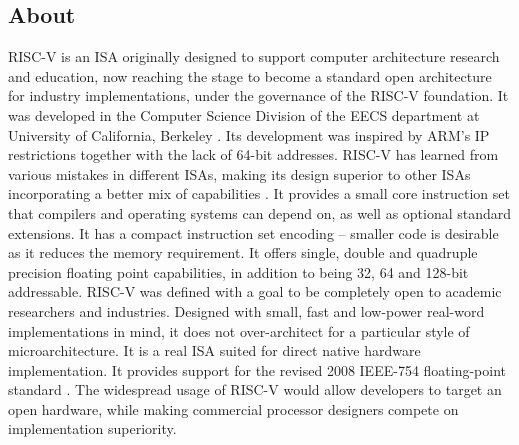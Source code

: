 \subsection{About}
 \label{sect6_1_1}
RISC-V is an ISA originally designed to support computer architecture research and education, now reaching the stage to become a standard open architecture for industry implementations, under the governance of the RISC-V foundation. It was developed in the Computer Science Division of the EECS department at University of California, Berkeley \cite{riscv_home}. Its development was inspired by ARM's IP restrictions together with the lack of 64-bit addresses. \newline\newline
RISC-V has learned from various mistakes in different ISAs, making its design superior to other ISAs incorporating a better mix of capabilities \cite{riscv_isa_free}. It provides a small core instruction set that compilers and operating systems can depend on, as well as optional standard extensions. It has a compact instruction set encoding – smaller code is desirable as it reduces the memory requirement. It offers single, double and quadruple precision floating point capabilities, in addition to being 32, 64 and 128-bit addressable. \newline\newline
RISC-V was defined with a goal to be completely open to academic researchers and industries. Designed with small, fast and low-power real-word implementations in mind, it does not over-architect for a particular style of microarchitecture. It is a real ISA suited for direct native hardware implementation. It provides support for the revised 2008 IEEE-754 floating-point standard \cite{ieee_754}. The widespread usage of RISC-V would allow developers to target an open hardware, while making commercial processor designers compete on implementation superiority. 

